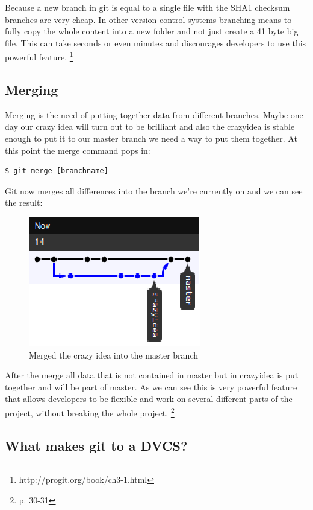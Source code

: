 Because a new branch in git is equal to a single
file with the SHA1 checksum branches are very cheap. In other version control systems branching means to
fully copy the whole content into a new folder and not just create a 41 byte big
file. This can take seconds or even minutes and discourages developers to use
this powerful feature. \footnote{ \cite{gitpro2009} http://progit.org/book/ch3-1.html }

\subsection {Merging}

Merging is the need of putting together data from different branches. Maybe one
day our crazy idea will turn out to be brilliant and also the crazyidea is
stable enough to put it to our master branch we need a way to put them together.
At this point the merge command pops in:

\begin{lstlisting}
$ git merge [branchname]
\end{lstlisting}

Git now merges all differences into the branch we're currently on and we can see
the result:
\begin{figure}[h]
  \centering 
  \includegraphics{img/merge1}
  \caption{Merged the crazy idea into the master branch}
  \label{}
\end{figure}

After the merge all data that is not contained in master but in crazyidea is put
together and will be part of master. As we can see this is very powerful feature
that allows developers to be flexible and work on several different parts of the
project, without breaking the whole project. \footnote{ \cite{gitinternals2008}
p. 30-31}

\subsection {What makes git to a DVCS?}

